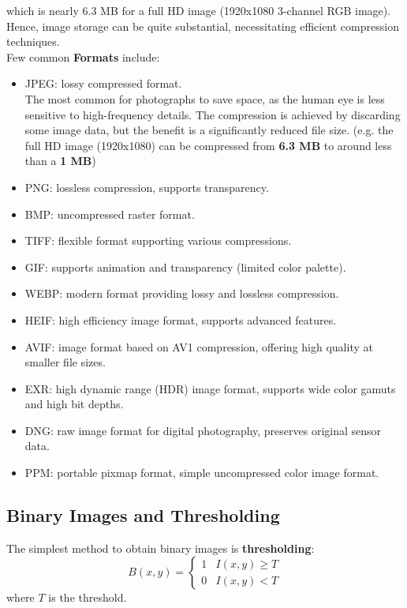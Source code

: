 which is nearly 6.3 MB for a full HD image (1920x1080 3-channel RGB image). 
Hence, image storage can be quite substantial, necessitating efficient compression techniques. \\

Few common \textbf{Formats} include:
\begin{itemize}
    \item JPEG: lossy compressed format. \\
    The most common for photographs to save space, as the human eye is less sensitive to high-frequency details. The compression is achieved by discarding some image data, but the benefit is a significantly reduced file size. (e.g. the full HD image (1920x1080) can be compressed from {\bf 6.3 MB} to around less than a {\bf 1 MB})
    \item PNG: lossless compression, supports transparency.
    \item BMP: uncompressed raster format.
    \item TIFF: flexible format supporting various compressions.
    \item GIF: supports animation and transparency (limited color palette).
    \item WEBP: modern format providing lossy and lossless compression.
    \item HEIF: high efficiency image format, supports advanced features.
    \item AVIF: image format based on AV1 compression, offering high quality at smaller file sizes.
    \item EXR: high dynamic range (HDR) image format, supports wide color gamuts and high bit depths.
    \item DNG: raw image format for digital photography, preserves original sensor data.
    \item PPM: portable pixmap format, simple uncompressed color image format.
\end{itemize}

\subsection{Binary Images and Thresholding}



\noindent The simplest method to obtain binary images is \textbf{thresholding}:
\[
B(x,y) = \begin{cases}
1 & I(x,y) \geq T \\
0 & I(x,y) < T
\end{cases}
\]
where $T$ is the threshold.

